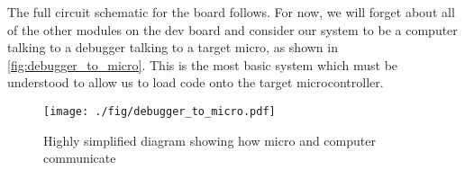 The full circuit schematic for the board follows. 
For now, we will forget about all of the other modules on the dev board and consider our system to be a computer talking to a debugger talking to a target micro, as shown in \autoref{fig:debugger_to_micro}. 
This is the most basic system which must be understood to allow us to load code onto the target microcontroller.

\begin{figure}[t]
  \texttt{[image: ./fig/debugger\_to\_micro.pdf]}
  \caption{Highly simplified diagram showing how micro and computer communicate}
  \label{fig:debugger_to_micro}
\end{figure}

\afterpage{
  \begin{landscape}
    \centering
    
 \end{landscape}
} 



